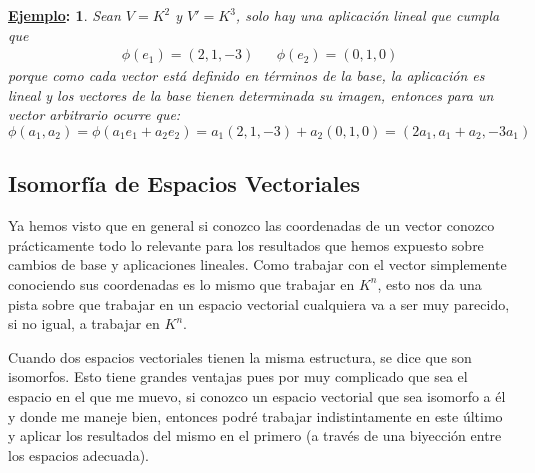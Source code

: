 \documentclass[10pt,a4paper,openright]{book}
\theoremstyle{break}
\newtheorem*{ej}{\underline{Ejemplo}:}
\begin{document}
\begin{ej}
Sean $V=K^2$ y $V'=K^3$, solo hay una aplicación lineal que cumpla que
\begin{align*}
\phi(e_1)=(2,1,-3) & & \phi(e_2)=(0,1,0)
\end{align*}
porque como cada vector está definido en términos de la base, la aplicación es lineal y los vectores de la base tienen determinada su imagen, entonces para un vector arbitrario ocurre que:
$$
\phi(a_1, a_2)=\phi(a_1e_1+a_2e_2)=a_1(2,1,-3)+a_2(0,1,0)=(2a_1, a_1+a_2, -3a_1)
$$
\end{ej}

\subsection{Isomorfía de Espacios Vectoriales}
Ya hemos visto que en general si conozco las coordenadas de un vector conozco prácticamente todo lo relevante para los resultados que hemos expuesto sobre cambios de base y aplicaciones lineales. Como trabajar con el vector simplemente conociendo sus coordenadas es lo mismo que trabajar en $K^n$, esto nos da una pista sobre que trabajar en un espacio vectorial cualquiera va a ser muy parecido, si no igual, a trabajar en $K^n$.

Cuando dos espacios vectoriales tienen la misma estructura, se dice que son isomorfos. Esto tiene grandes ventajas pues por muy complicado que sea el espacio en el que me muevo, si conozco un espacio vectorial que sea isomorfo a él y donde me maneje bien, entonces podré trabajar indistintamente en este último y aplicar los resultados del mismo en el primero (a través de una biyección entre los espacios adecuada).
\end{document}
